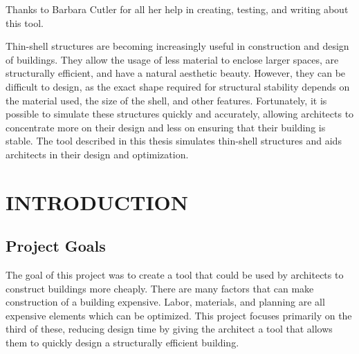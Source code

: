 \documentclass{thesis}
\author{R. Allan Pendergrast}
\begin{document}
 
\titlepage             %
\tableofcontents       %
\listoftables          %
\listoffigures         %

Thanks to Barbara Cutler for all her help in creating, testing, and writing about this tool.

Thin-shell structures are becoming increasingly useful in construction and design of buildings.  They allow the usage of less material to enclose
larger spaces, are structurally efficient, and have a natural aesthetic beauty.  However, they can be difficult to design, as the exact shape
required for structural stability depends on the material used, the size of the shell, and other features.  Fortunately, it is possible to simulate
these structures quickly and accurately, allowing architects to concentrate more on their design and less on ensuring that their building is
stable.  The tool described in this thesis simulates thin-shell structures and aids architects in their design and optimization.

\chapter{INTRODUCTION} \label{chp:introduction}

\section{Project Goals} \label{sec:goals}
The goal of this project was to create a tool that could be used by architects to construct buildings more cheaply.  There are many factors
that can make construction of a building expensive.  Labor, materials, and planning are all expensive elements which can be optimized.
This project focuses primarily on the third of these, reducing design time by giving the architect a tool that allows them to quickly design a
structurally efficient building.
\end{document}

